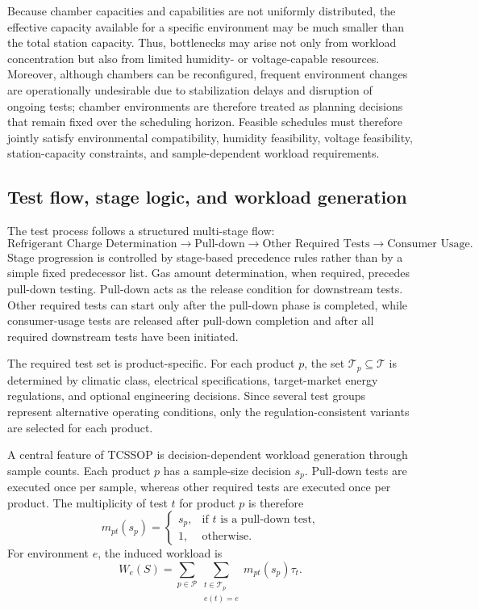 Because chamber capacities and capabilities are not uniformly distributed, the effective capacity available for a specific environment may be much smaller than the total station capacity. Thus, bottlenecks may arise not only from workload concentration but also from limited humidity- or voltage-capable resources. Moreover, although chambers can be reconfigured, frequent environment changes are operationally undesirable due to stabilization delays and disruption of ongoing tests; chamber environments are therefore treated as planning decisions that remain fixed over the scheduling horizon. Feasible schedules must therefore jointly satisfy environmental compatibility, humidity feasibility, voltage feasibility, station-capacity constraints, and sample-dependent workload requirements.

\subsection{Test flow, stage logic, and workload generation}
\label{subsec:test_logic}

The test process follows a structured multi-stage flow:
\[
\text{Refrigerant Charge Determination}
\rightarrow
\text{Pull-down}
\rightarrow
\text{Other Required Tests}
\rightarrow
\text{Consumer Usage}.
\]
Stage progression is controlled by stage-based precedence rules rather than by a simple fixed predecessor list. Gas amount determination, when required, precedes pull-down testing. Pull-down acts as the release condition for downstream tests. Other required tests can start only after the pull-down phase is completed, while consumer-usage tests are released after pull-down completion and after all required downstream tests have been initiated.

The required test set is product-specific. For each product \(p\), the set \(\mathcal{T}_p\subseteq\mathcal{T}\) is determined by climatic class, electrical specifications, target-market energy regulations, and optional engineering decisions. Since several test groups represent alternative operating conditions, only the regulation-consistent variants are selected for each product.

A central feature of TCSSOP is decision-dependent workload generation through sample counts. Each product \(p\) has a sample-size decision \(s_p\). Pull-down tests are executed once per sample, whereas other required tests are executed once per product. The multiplicity of test \(t\) for product \(p\) is therefore
\[
m_{pt}(s_p)=
\left\{
\begin{array}{ll}
s_p, & \text{if } t \text{ is a pull-down test,}\\
1,   & \text{otherwise.}
\end{array}
\right.\]
For environment \(e\), the induced workload is
\[
W_e(S)=
\sum_{p\in\mathcal{P}}
\sum_{\substack{t\in\mathcal{T}_p \\ e(t)=e}}
m_{pt}(s_p)\tau_t.
\]

